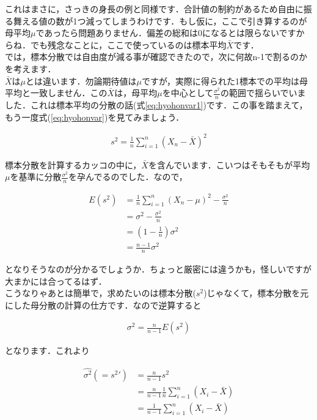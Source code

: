 \documentclass[11pt,a4paper]{ujreport} 	%
\begin{document}
これはまさに，さっきの身長の例と同様です．合計値の制約があるため自由に振る舞える値の数が1つ減ってしまうわけです．もし仮に，ここで引き算するのが母平均$\mu$であったら問題ありません．偏差の総和は0になるとは限らないですからね．でも残念なことに，ここで使っているのは標本平均$\bar{X}$です．\\

では，標本分散では自由度が減る事が確認できたので，次に何故n-1で割るのかを考えます．\\

$\bar{X}$は$\mu$とは違います．勿論期待値は$\mu$ですが，実際に得られた1標本での平均は母平均と一致しません．この$\bar{X}$は，母平均$\mu$を中心として$\frac{\sigma^2}{n}$の範囲で揺らいでいました．これは標本平均の分散の話(式\ref{eq:hyohonvar1})です．この事を踏まえて，もう一度式(\ref{eq:hyohonvar})を見てみましょう．

\begin{align}
  s^2 = \frac{1}{n} \sum_{i=1}^n(X_n - \bar{X})^2
\end{align}

標本分散を計算するカッコの中に，$\bar{X}$を含んでいます．こいつはそもそもが平均$\mu$を基準に分散$\frac{\sigma^2}{n}$を孕んでるのでした．なので，

\begin{align}
  E(s^2) &= \frac{1}{n} \sum_{i=1}^n(X_n - \mu)^2 - \frac{\sigma^2}{n}\\
      &= \sigma^2 - \frac{\sigma^2}{n}\\
      &= (1-\frac{1}{n})\sigma^2\\
      &= \frac{n-1}{n}\sigma^2
\end{align}

となりそうなのが分かるでしょうか．ちょっと厳密には違うかも，怪しいですが大まかには合ってるはず．\\

こうなりゃあとは簡単で，求めたいのは標本分散($s^2$)じゃなくて，標本分散を元にした母分散の計算の仕方です．なので逆算すると

\begin{align}
  \sigma^2 = \frac{n}{n-1}E(s^2)
\end{align}

となります．これより

\begin{align}
  \hat{\sigma^2}(=s^2\prime) &= \frac{n}{n-1}s^2\\
                 &= \frac{n}{n-1}\frac{1}{n}\sum_{i=1}^n (X_i - \bar{X})\\
                 &= \frac{1}{n-1}\sum_{i=1}^n (X_i - \bar{X})
\end{align}
\end{document}
